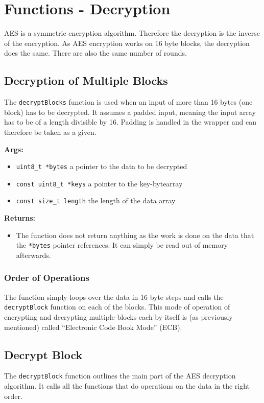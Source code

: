 \chapter{Functions - Decryption}
\label{ch:decryption}

AES is a symmetric encryption algorithm. Therefore the decryption is the inverse of the encryption. As AES encryption works on 16 byte blocks, the decryption does the same. There are also the same number of rounds.

\section{Decryption of Multiple Blocks}
\label{ch:dec_multipleblocks}
The \lstinline|decryptBlocks| function is used when an input of more than 16 bytes (one block) has to be decrypted. It assumes a padded input, meaning the input array has to be of a length divisible by 16. Padding is handled in the wrapper and can therefore be taken as a given.

\textbf{Args:}
\begin{itemize}
  \item \lstinline{uint8_t *bytes} a pointer to the data to be decrypted
  \item \lstinline{const uint8_t *keys} a pointer to the key-bytearray
  \item \lstinline{const size_t length} the length of the data array
\end{itemize}

\textbf{Returns:}
\begin{itemize}
  \item The function does not return anything as the work is done on the data that the \lstinline{*bytes} pointer references. It can simply be read out of memory afterwards.
\end{itemize}

\subsection{Order of Operations}
The function simply loops over the data in 16 byte steps and calls the \lstinline{decryptBlock} function on each of the blocks. This mode of operation of encrypting and decrypting multiple blocks each by itself is (as previously mentioned) called \enquote{Electronic Code Book Mode} (\ac{ECB}).

\section{Decrypt Block}
\label{ch:dec_block}
The \lstinline{decryptBlock} function outlines the main part of the AES decryption algorithm. It calls all the functions that do operations on the data in the right order.

